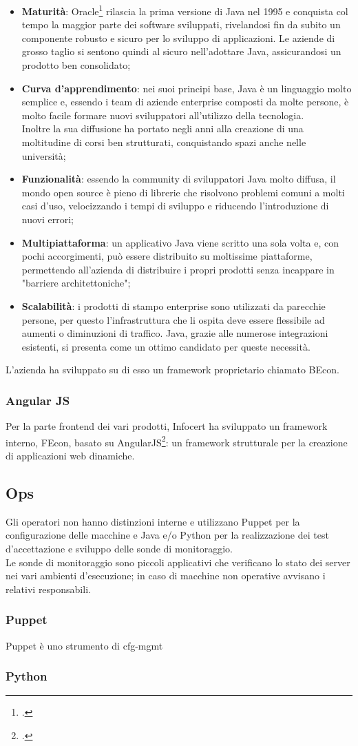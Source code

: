 \begin{itemize}
	\item \textbf{Maturità}: Oracle\footcite{site:oracle} rilascia la prima versione di Java nel 1995 e conquista col tempo la maggior parte dei software sviluppati, rivelandosi fin da subito un componente robusto e sicuro per lo sviluppo di applicazioni. Le aziende di grosso taglio si sentono quindi al sicuro nell'adottare Java, assicurandosi un prodotto ben consolidato;
	\item \textbf{Curva d'apprendimento}: nei suoi principi base, Java è un linguaggio molto semplice e, essendo i team di aziende enterprise composti da molte persone, è molto facile formare nuovi sviluppatori all'utilizzo della tecnologia.\\
	Inoltre la sua diffusione ha portato negli anni alla creazione di una moltitudine di corsi ben strutturati, conquistando spazi anche nelle università;
	\item \textbf{Funzionalità}: essendo la community di sviluppatori Java molto diffusa, il mondo open source è pieno di librerie che risolvono problemi comuni a molti casi d'uso, velocizzando i tempi di sviluppo e riducendo l'introduzione di nuovi errori;
	\item \textbf{Multipiattaforma}: un applicativo Java viene scritto una sola volta e, con pochi accorgimenti, può essere distribuito su moltissime piattaforme, permettendo all'azienda di distribuire i propri prodotti senza incappare in "barriere architettoniche";
	\item \textbf{Scalabilità}: i prodotti di stampo enterprise sono utilizzati da parecchie persone, per questo l'infrastruttura che li ospita deve essere flessibile ad aumenti o diminuzioni di traffico. Java, grazie alle numerose integrazioni esistenti, si presenta come un ottimo candidato per queste necessità.
\end{itemize}
L'azienda ha sviluppato su di esso un \gls{framework} proprietario chiamato BEcon.
\subsubsection{Angular JS}
Per la parte frontend dei vari prodotti, Infocert ha sviluppato un \gls{framework} interno, FEcon, basato su AngularJS\footcite{site:angular}: un \gls{framework} strutturale per la creazione di applicazioni web dinamiche.
\subsection{Ops}
Gli operatori non hanno distinzioni interne e utilizzano Puppet per la configurazione delle macchine e Java e/o Python per la realizzazione dei test d'accettazione e sviluppo delle sonde di monitoraggio. \\
Le sonde di monitoraggio sono piccoli applicativi che verificano lo stato dei server nei vari ambienti d'esecuzione; in caso di macchine non operative avvisano i relativi responsabili.
\subsubsection{Puppet}
Puppet è uno strumento di \gls{cfg-mgmt}
\subsubsection{Python}
